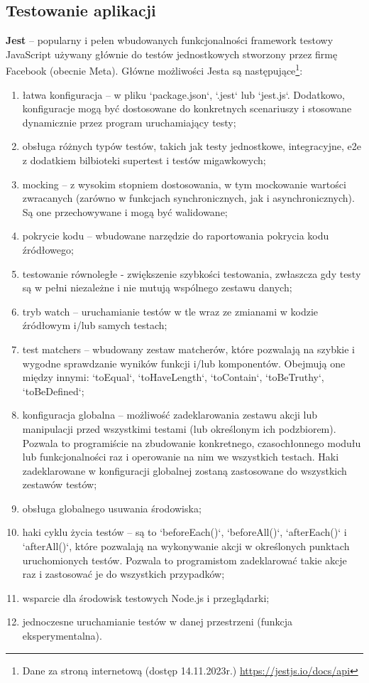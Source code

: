 \documentclass[12pt, a4paper, twoside, openany]{book}
\newcommand{\forceindent}{\leavevmode{\parindent=1.3em\indent}}
\begin{document}
\subsection{Testowanie aplikacji}
\forceindent \textbf{Jest} -- popularny i pełen wbudowanych funkcjonalności framework testowy JavaScript używany głównie do testów jednostkowych stworzony przez firmę Facebook (obecnie Meta). Główne możliwości Jesta są następujące\footnote{Dane za stroną internetową (dostęp 14.11.2023r.) \url{https://jestjs.io/docs/api}}:
\begin{enumerate}[label=--]
    \item łatwa konfiguracja -- w pliku `package.json`, `.jest` lub `jest.js`. Dodatkowo, konfiguracje mogą być dostosowane do konkretnych scenariuszy i stosowane dynamicznie przez program uruchamiający testy;
    \item obsługa różnych typów testów, takich jak testy jednostkowe, integracyjne, e2e z dodatkiem bilbioteki supertest i testów migawkowych;
    \item mocking -- z wysokim stopniem dostosowania, w tym mockowanie wartości zwracanych (zarówno w funkcjach synchronicznych, jak i asynchronicznych). Są one przechowywane i mogą być walidowane;
    \item pokrycie kodu -- wbudowane narzędzie do raportowania pokrycia kodu źródłowego;
    \item testowanie równoległe - zwiększenie szybkości testowania, zwłaszcza gdy testy są w pełni niezależne i nie mutują wspólnego zestawu danych;
    \item tryb watch -- uruchamianie testów w tle wraz ze zmianami w kodzie źródłowym i/lub samych testach;
    \item test matchers -- wbudowany zestaw matcherów, które pozwalają na szybkie i wygodne sprawdzanie wyników funkcji i/lub komponentów. Obejmują one między innymi: `toEqual`, `toHaveLength`, `toContain`, `toBeTruthy`, `toBeDefined`;
    \item konfiguracja globalna -- możliwość zadeklarowania zestawu akcji lub manipulacji przed wszystkimi testami (lub określonym ich podzbiorem). Pozwala to programiście na zbudowanie konkretnego, czasochłonnego modułu lub funkcjonalności raz i operowanie na nim we wszystkich testach. Haki zadeklarowane w konfiguracji globalnej zostaną zastosowane do wszystkich zestawów testów;
    \item obsługa globalnego usuwania środowiska;
    \item haki cyklu życia testów -- są to `beforeEach()`, `beforeAll()`, `afterEach()` i `afterAll()`, które pozwalają na wykonywanie akcji w określonych punktach uruchomionych testów. Pozwala to programistom zadeklarować takie akcje raz i zastosować je do wszystkich przypadków;
    \item wsparcie dla środowisk testowych Node.js i przeglądarki;
    \item jednoczesne uruchamianie testów w danej przestrzeni (funkcja eksperymentalna).
\end{enumerate}
\end{document}
